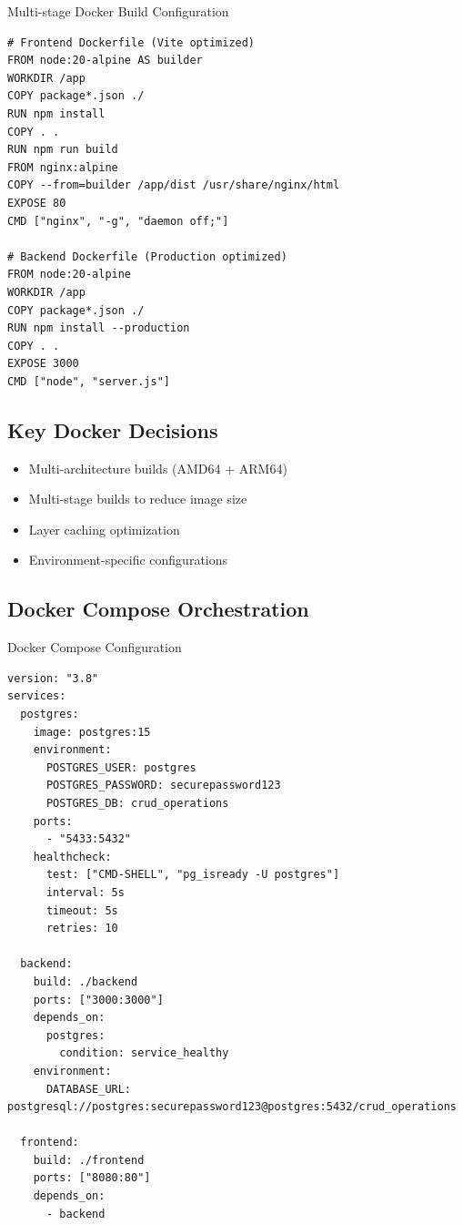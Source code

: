 \documentclass[12pt]{article}
\begin{document}
\begin{codebox}{Multi-stage Docker Build Configuration}
\begin{lstlisting}
# Frontend Dockerfile (Vite optimized)
FROM node:20-alpine AS builder
WORKDIR /app
COPY package*.json ./
RUN npm install
COPY . .
RUN npm run build
FROM nginx:alpine
COPY --from=builder /app/dist /usr/share/nginx/html
EXPOSE 80
CMD ["nginx", "-g", "daemon off;"]

# Backend Dockerfile (Production optimized)
FROM node:20-alpine
WORKDIR /app
COPY package*.json ./
RUN npm install --production
COPY . .
EXPOSE 3000
CMD ["node", "server.js"]
\end{lstlisting}
\end{codebox}

\subsection{Key Docker Decisions}
\begin{itemize}
\item \textcolor{green}{\faCheckCircle} Multi-architecture builds (AMD64 + ARM64)
\item \textcolor{green}{\faCheckCircle} Multi-stage builds to reduce image size
\item \textcolor{green}{\faCheckCircle} Layer caching optimization
\item \textcolor{green}{\faCheckCircle} Environment-specific configurations
\end{itemize}

\subsection{Docker Compose Orchestration}
\begin{codebox}{Docker Compose Configuration}
\begin{lstlisting}
version: "3.8"
services:
  postgres:
    image: postgres:15
    environment:
      POSTGRES_USER: postgres
      POSTGRES_PASSWORD: securepassword123
      POSTGRES_DB: crud_operations
    ports:
      - "5433:5432"
    healthcheck:
      test: ["CMD-SHELL", "pg_isready -U postgres"]
      interval: 5s
      timeout: 5s
      retries: 10

  backend:
    build: ./backend
    ports: ["3000:3000"]
    depends_on:
      postgres:
        condition: service_healthy
    environment:
      DATABASE_URL: postgresql://postgres:securepassword123@postgres:5432/crud_operations

  frontend:
    build: ./frontend
    ports: ["8080:80"]
    depends_on:
      - backend
\end{lstlisting}
\end{codebox}
\end{document}
